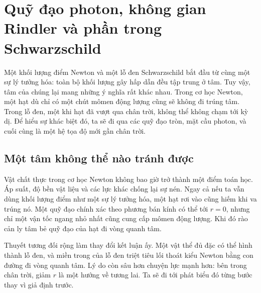 \chapter{Quỹ đạo photon, không gian Rindler và phần trong Schwarzschild}

Một khối lượng điểm Newton và một lỗ đen Schwarzschild bắt đầu từ cùng một sự lý tưởng hóa: toàn bộ khối lượng gây hấp dẫn đều tập trung ở tâm. Tuy vậy, tâm của chúng lại mang những ý nghĩa rất khác nhau. Trong cơ học Newton, một hạt dù chỉ có một chút mômen động lượng cũng sẽ không đi trúng tâm. Trong lỗ đen, một khi hạt đã vượt qua chân trời, không thể không chạm tới kỳ dị. Để hiểu sự khác biệt đó, ta sẽ đi qua các quỹ đạo tròn, mặt cầu photon, và cuối cùng là một hệ tọa độ mới gần chân trời.

\section{Một tâm không thể nào tránh được}

Vật chất thực trong cơ học Newton không bao giờ trở thành một điểm toán học. Áp suất, độ bền vật liệu và các lực khác chống lại sự nén. Ngay cả nếu ta vẫn dùng khối lượng điểm như một sự lý tưởng hóa, một hạt rơi vào cũng hiếm khi va trúng nó. Một quỹ đạo chính xác theo phương bán kính có thể tới \(r=0\), nhưng chỉ một vận tốc ngang nhỏ nhất cũng cung cấp mômen động lượng. Khi đó rào cản ly tâm bẻ quỹ đạo của hạt đi vòng quanh tâm.

Thuyết tương đối rộng làm thay đổi kết luận ấy. Một vật thể đủ đặc có thể hình thành lỗ đen, và miền trong của lỗ đen triệt tiêu lối thoát kiểu Newton bằng con đường đi vòng quanh tâm. Lý do còn sâu hơn chuyện lực mạnh hơn: bên trong chân trời, giảm \(r\) là một hướng về tương lai. Ta sẽ đi tới phát biểu đó từng bước thay vì giả định trước.

\begin{classroomqa}
\end{classroomqa}

